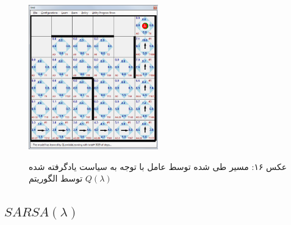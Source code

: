 \documentclass[10pt,a4paper]{article}
\begin{document}
\begin{figure}[H]
    \centering
    \includegraphics[width=0.5\textwidth]{qlambda-exec}
    \begin{center}
    \textarabic{عکس ۱۶: مسیر طی شده توسط عامل با توجه به سیاست یادگرفته شده توسط الگوریتم $Q(\lambda)$ }
    \end{center}
\end{figure}
\subsection{$SARSA(\lambda)$}
\end{document}
